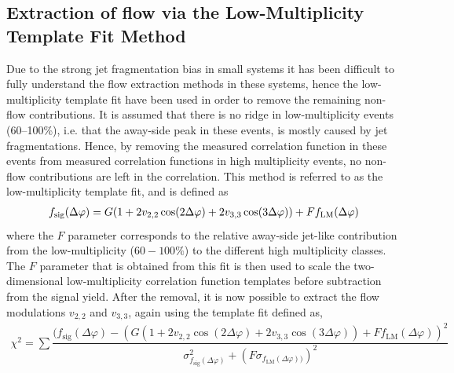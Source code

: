 \subsection{Extraction of flow via the Low-Multiplicity Template Fit Method}
Due to the strong jet fragmentation bias in small systems it has been difficult to fully understand the flow extraction methods in these systems, hence the low-multiplicity template fit have been used in order to remove the remaining non-flow contributions. %
It is assumed that there is no ridge in low-multiplicity events (60--100\%), i.e. that the away-side peak in these events, is mostly caused by jet fragmentations. Hence, by removing the measured correlation function in these events from measured correlation functions in high multiplicity events, no non-flow contributions are left in the correlation. This method is referred to as the low-multiplicity template fit, and is defined as
\begin{eqnarray}
f_{\rm{sig}}(\Delta\varphi) = G(1 + 2v_{2,2}\cos(2\Delta\varphi) + 2v_{3,3}\cos(3\Delta\varphi)) + Ff_{\rm{LM}}(\Delta\varphi)
\end{eqnarray}
where the $F$ parameter corresponds to the relative away-side jet-like contribution from the low-multiplicity ($60-100\%$) to the different high multiplicity classes. The $F$ parameter that is obtained from this fit is then used to scale the two-dimensional low-multiplicity correlation function templates before subtraction from the signal yield. 
After the removal, it is now possible to extract the flow modulations $v_{2,2}$ and $v_{3,3}$, again using the template fit defined as,
\begin{eqnarray}
\chi^{2} = \sum \dfrac{ ( f_{\mathrm{sig}}(\Delta\varphi) - ( G(1 + 2v_{2,2}\cos(2\Delta\varphi) + 2v_{3,3}\cos(3\Delta\varphi)) + Ff_{\mathrm{LM}}(\Delta\varphi) )^{2} }{ \sigma_{ f_{\mathrm{sig}}(\Delta\varphi)}^{2} +  (F\sigma_{ f_{\mathrm{LM}}(\Delta\varphi) ) })^{2} }
\end{eqnarray}

